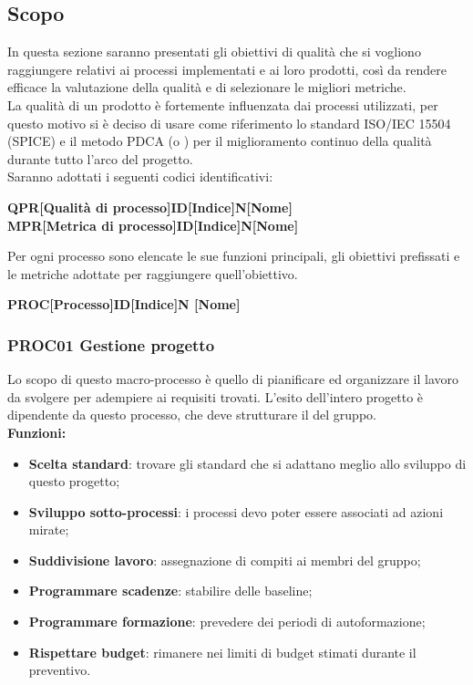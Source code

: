 \documentclass[../piano_di_qualifica.tex]{subfiles}
\begin{document}
\subsection{Scopo}
In questa sezione saranno presentati gli obiettivi di qualità che si vogliono raggiungere relativi ai processi implementati e ai loro prodotti, così da rendere efficace la valutazione della qualità e di selezionare le migliori metriche.\\
La qualità di un prodotto è fortemente influenzata dai processi utilizzati, per questo motivo si è deciso di usare come riferimento lo standard ISO/IEC 15504 (SPICE)  e il metodo PDCA (o ) per il miglioramento continuo della qualità durante tutto l'arco del progetto.\\
Saranno adottati i seguenti codici identificativi:\par

\begin{center}
	\textbf{QPR[Qualità di processo]ID[Indice]N[Nome]}\\
	\textbf{MPR[Metrica di processo]ID[Indice]N[Nome]}
\end{center}

Per ogni processo sono elencate le sue funzioni principali, gli obiettivi prefissati e le metriche adottate per raggiungere quell’obiettivo.

\begin{center}
	\textbf{PROC[Processo]ID[Indice]N [Nome]}
\end{center}

\subsubsection{PROC01 Gestione progetto}
Lo scopo di questo macro-processo è quello di pianificare ed organizzare il lavoro da svolgere per adempiere ai requisiti trovati. L'esito dell'intero progetto è dipendente da questo processo, che deve strutturare il  del gruppo.\\

\setlength{\parindent}{0pt}\textbf{Funzioni:}
\smallbreak
\begin{itemize}
	\item \textbf{Scelta standard}: trovare gli standard che si adattano meglio allo sviluppo di questo progetto;
	\item \textbf{Sviluppo sotto-processi}: i processi devo poter essere associati ad azioni mirate;
	\item \textbf{Suddivisione lavoro}: assegnazione di compiti ai membri del gruppo;
	\item \textbf{Programmare scadenze}: stabilire delle baseline;
	\item \textbf{Programmare formazione}: prevedere dei periodi di autoformazione;
	\item \textbf{Rispettare budget}: rimanere nei limiti di budget stimati durante il preventivo.
\end{itemize}
\end{document}
